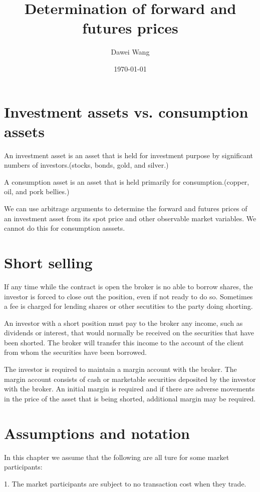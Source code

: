 \documentclass{article}
\title{Determination of forward and futures prices}
\author{Dawei Wang}
\date{\today}
\begin{document}
	\maketitle
\section{Investment assets vs. consumption assets}
\hspace{\fill}

An investment asset is an asset that is held for investment purpose by significant numbers of investors.(stocks, bonds, gold, and silver.)

A consumption asset is an asset that is held primarily for consumption.(copper, oil, and pork bellies.)

We can use arbitrage arguments to determine the forward and futures prices of an investment asset from its spot price and other observable market variables. We cannot do this for consumption asssets.

\section{Short selling}
If any time while the contract is open the broker is no able to borrow shares, the investor is forced to close out the position, even if not ready to do so. Sometimes a fee is charged for lending shares or other secutities to the party doing shorting.

An investor with a short position must pay to the broker any income, such as dividends or interest, that would normally be received on the securities that have been shorted. The broker will transfer this income to the account of the client from whom the securities have been borrowed.

The investor is required to maintain a margin account with the broker. The margin account consists of cash or marketable securities deposited by the investor with the broker. An initial margin is required and if there are adverse movements in the price of the asset that is being shorted, additional margin may be required.

\section{Assumptions and notation}
In this chapter we assume that  the following are all ture for some market participants:

1. The market participants are subject to no transaction cost when they trade.
\end{document}
